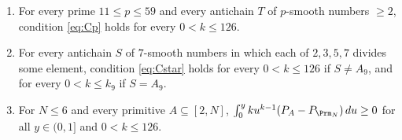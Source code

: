 \begin{proposition}\label{prop:cert}
\begin{enumerate}
\item[(a)] For every prime $11\le p\le59$ and every antichain $T$ of $p$-smooth numbers $\ge2$,
condition \eqref{eq:Cp} holds for every $0<k\le126$.
\item[(b)] For every antichain $S$ of $7$-smooth numbers in which each of $2,3,5,7$ divides some
element, condition \eqref{eq:Cstar} holds for every $0<k\le126$ if $S\ne A_9$, and for every
$0<k\le k_9$ if $S=A_9$.
\item[(c)] For $N\le6$ and every primitive $A\subseteq[2,N]$,
$\int_0^yku^{k-1}(P_A-P_{\Prm_N})\,du\ge0$ for all $y\in(0,1]$ and $0<k\le126$.
\end{enumerate}
\end{proposition}

